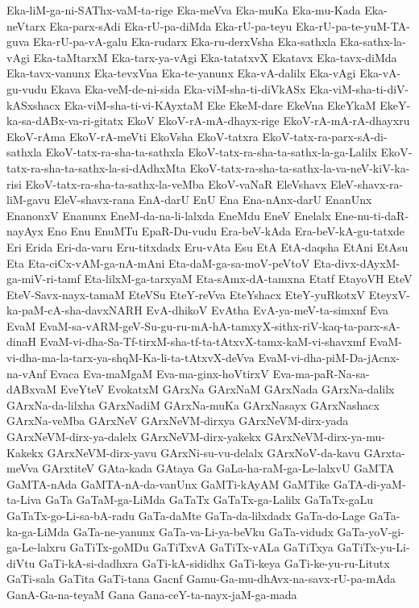 {Eka-liM-ga-ni-SAThx-vaM-ta-rige
Eka-meVva
Eka-muKa
Eka-mu-Kada
Eka-neVtarx
Eka-parx-sAdi
Eka-rU-pa-diMda
Eka-rU-pa-teyu
Eka-rU-pa-te-yuM-TA-guva
Eka-rU-pa-vA-galu
Eka-rudarx
Eka-ru-derxVsha
Eka-sathxla
Eka-sathx-la-vAgi
Eka-taMtarxM
Eka-tarx-ya-vAgi
Eka-tatatxvX
Ekatavx
Eka-tavx-diMda
Eka-tavx-vanunx
Eka-tevxVna
Eka-te-yanunx
Eka-vA-dalilx
Eka-vAgi
Eka-vA-gu-vudu
Ekava
Eka-veM-de-ni-sida
Eka-viM-sha-ti-diVkASx
Eka-viM-sha-ti-diV-kASxshacx
Eka-viM-sha-ti-vi-KAyxtaM
Eke
EkeM-dare
EkeVna
EkeYkaM
EkeY-ka-sa-dABx-va-ri-gitatx
EkoV
EkoV-rA-mA-dhayx-rige
EkoV-rA-mA-rA-dhayxru
EkoV-rAma
EkoV-rA-meVti
EkoVsha
EkoV-tatxra
EkoV-tatx-ra-parx-sA-di-sathxla
EkoV-tatx-ra-sha-ta-sathxla
EkoV-tatx-ra-sha-ta-sathx-la-ga-Lalilx
EkoV-tatx-ra-sha-ta-sathx-la-si-dAdhxMta
EkoV-tatx-ra-sha-ta-sathx-la-va-neV-kiV-ka-risi
EkoV-tatx-ra-sha-ta-sathx-la-veMba
EkoV-vaNaR
EleVshavx
EleV-shavx-ra-liM-gavu
EleV-shavx-rana
EnA-darU
EnU
Ena
Ena-nAnx-darU
EnanUnx
EnanonxV
Enanunx
EneM-da-na-li-lalxda
EneMdu
EneV
Enelalx
Ene-nu-ti-daR-nayAyx
Eno
Enu
EnuMTu
EpaR-Du-vudu
Era-beV-kAda
Era-beV-kA-gu-tatxde
Eri
Erida
Eri-da-varu
Eru-titxdadx
Eru-vAta
Esu
EtA
EtA-daqsha
EtAni
EtAsu
Eta
Eta-ciCx-vAM-ga-nA-mAni
Eta-daM-ga-sa-moV-peVtoV
Eta-divx-dAyxM-ga-miV-ri-tamf
Eta-lilxM-ga-tarxyaM
Eta-sAmx-dA-tamxna
Etatf
EtayoVH
EteV
EteV-Savx-nayx-tamaM
EteVSu
EteY-reVva
EteYshacx
EteY-yuRkotxV
EteyxV-ka-paM-cA-sha-davxNARH
EvA-dhikoV
EvAtha
EvA-ya-meV-ta-simxnf
Eva
EvaM
EvaM-sa-vARM-geV-Su-gu-ru-mA-hA-tamxyX-sithx-riV-kaq-ta-parx-sA-dinaH
EvaM-vi-dha-Sa-Tf-tirxM-sha-tf-ta-tAtxvX-tamx-kaM-vi-shavxmf
EvaM-vi-dha-ma-la-tarx-ya-shqM-Ka-li-ta-tAtxvX-deVva
EvaM-vi-dha-piM-Da-jAcnx-na-vAnf
Evaca
Eva-maMgaM
Eva-ma-ginx-hoVtirxV
Eva-ma-paR-Na-sa-dABxvaM
EveYteV
EvokatxM
GArxNa
GArxNaM
GArxNada
GArxNa-dalilx
GArxNa-da-lilxha
GArxNadiM
GArxNa-muKa
GArxNasayx
GArxNashacx
GArxNa-veMba
GArxNeV
GArxNeVM-dirxya
GArxNeVM-dirx-yada
GArxNeVM-dirx-ya-dalelx
GArxNeVM-dirx-yakekx
GArxNeVM-dirx-ya-mu-Kakekx
GArxNeVM-dirx-yavu
GArxNi-su-vu-delalx
GArxNoV-da-kavu
GArxta-meVva
GArxtiteV
GAta-kada
GAtaya
Ga
GaLa-ha-raM-ga-Le-lalxvU
GaMTA
GaMTA-nAda
GaMTA-nA-da-vanUnx
GaMTi-kAyAM
GaMTike
GaTA-di-yaM-ta-Liva
GaTa
GaTaM-ga-LiMda
GaTaTx
GaTaTx-ga-Lalilx
GaTaTx-gaLu
GaTaTx-go-Li-sa-bA-radu
GaTa-daMte
GaTa-da-lilxdadx
GaTa-do-Lage
GaTa-ka-ga-LiMda
GaTa-ne-yanunx
GaTa-va-Li-ya-beVku
GaTa-vidudx
GaTa-yoV-gi-ga-Le-lalxru
GaTiTx-goMDu
GaTiTxvA
GaTiTx-vALa
GaTiTxya
GaTiTx-yu-Li-diVtu
GaTi-kA-si-dadhxra
GaTi-kA-sididhx
GaTi-keya
GaTi-ke-yu-ru-Litutx
GaTi-sala
GaTita
GaTi-tana
Gacnf
Gamu-Ga-mu-dhAvx-na-savx-rU-pa-mAda
GanA-Ga-na-teyaM
Gana
Gana-ceY-ta-nayx-jaM-ga-mada
}

